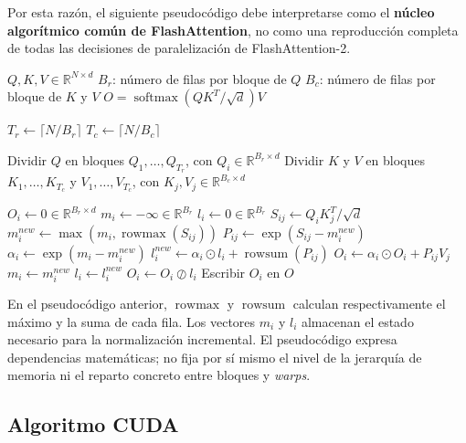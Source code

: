 Por esta razón, el siguiente pseudocódigo debe interpretarse como el \textbf{núcleo algorítmico común de FlashAttention}, no como una reproducción completa de todas las decisiones de paralelización de FlashAttention-2.

\begin{algorithm}[H]
\caption{Núcleo algorítmico por bloques de FlashAttention}
\label{alg:flashattention2}
\begin{algorithmic}[1]

\Require \(Q,K,V \in \mathbb{R}^{N\times d}\)
\Require \(B_r\): número de filas por bloque de \(Q\)
\Require \(B_c\): número de filas por bloque de \(K\) y \(V\)
\Ensure \(O = \operatorname{softmax}(QK^T/\sqrt{d})V\)

\State \(T_r \gets \lceil N/B_r \rceil\)
\State \(T_c \gets \lceil N/B_c \rceil\)

\State Dividir \(Q\) en bloques \(Q_1,\ldots,Q_{T_r}\), con \(Q_i \in \mathbb{R}^{B_r\times d}\)
\State Dividir \(K\) y \(V\) en bloques \(K_1,\ldots,K_{T_c}\) y \(V_1,\ldots,V_{T_c}\), con \(K_j,V_j \in \mathbb{R}^{B_c\times d}\)

\State \(O_i \gets 0 \in \mathbb{R}^{B_r\times d}\)
\State \(m_i \gets -\infty \in \mathbb{R}^{B_r}\)
\State \(l_i \gets 0 \in \mathbb{R}^{B_r}\)
    \State \(S_{ij} \gets Q_iK_j^T/\sqrt{d}\)
    \State \(m_i^{new} \gets \max(m_i,\operatorname{rowmax}(S_{ij}))\)
    \State \(P_{ij} \gets \exp(S_{ij}-m_i^{new})\)
    \State \(\alpha_i \gets \exp(m_i-m_i^{new})\)
    \State \(l_i^{new} \gets \alpha_i \odot l_i + \operatorname{rowsum}(P_{ij})\)
    \State \(O_i \gets \alpha_i \odot O_i + P_{ij}V_j\)
    \State \(m_i \gets m_i^{new}\)
    \State \(l_i \gets l_i^{new}\)
\EndFor
\State \(O_i \gets O_i \oslash l_i\)
\State Escribir \(O_i\) en \(O\)
\EndFor
\end{algorithmic}
\end{algorithm}

En el pseudocódigo anterior, \(\operatorname{rowmax}\) y \(\operatorname{rowsum}\) calculan respectivamente el máximo y la suma de cada fila. Los vectores \(m_i\) y \(l_i\) almacenan el estado necesario para la normalización incremental. El pseudocódigo expresa dependencias matemáticas; no fija por sí mismo el nivel de la jerarquía de memoria ni el reparto concreto entre bloques y \textit{warps}.

\subsection{Algoritmo CUDA}

